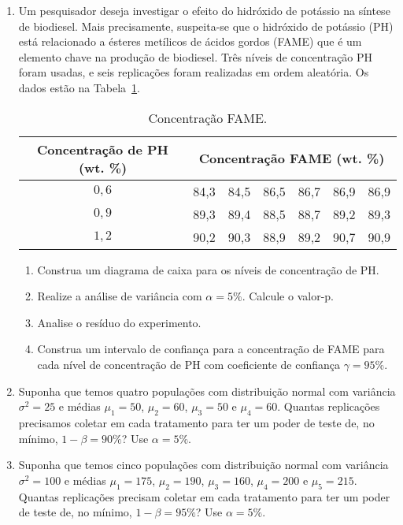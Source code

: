 \documentclass[11pt, a4paper]{article}
\begin{document}
\begin{enumerate}
	\item Um pesquisador deseja investigar o efeito do hidróxido de potássio na síntese de biodiesel. Mais precisamente, suspeita-se que o hidróxido de potássio (PH) está relacionado a ésteres metílicos de ácidos gordos (FAME) que é um elemento chave na produção de biodiesel. Três níveis de concentração PH foram usadas, e seis replicações foram realizadas em ordem aleatória. Os dados estão na Tabela~\ref{tab:fame-ph}.
	\begin{table}[htbp]
		\centering
		\begin{tabular}{c|cccccc}
			\toprule[0.05cm]
			Concentração de PH (wt. \%) & \multicolumn{6}{|c}{Concentração FAME (wt. \%)} \\
			\midrule[0.025cm]
			$0,6$ & 84,3 & 84,5 & 86,5 & 86,7 & 86,9 & 86,9\\
			$0,9$ & 89,3 & 89,4 & 88,5 & 88,7 & 89,2 & 89,3\\
			$1,2$ & 90,2 & 90,3 & 88,9 & 89,2 & 90,7 & 90,9\\ \bottomrule[0.05cm] 
		\end{tabular}
		\caption{Concentração FAME.}
		\label{tab:fame-ph}
	\end{table}
	\begin{enumerate}
		\item Construa um diagrama de caixa para os níveis de concentração de PH.
		\item Realize a análise de variância com $\alpha=5\%$. Calcule o valor-p.
		\item Analise o resíduo do experimento.
		\item Construa um intervalo de confiança para a concentração de  FAME para cada nível de concentração de PH com coeficiente de confiança $\gamma=95\%$.
	\end{enumerate}

	\item Suponha que temos quatro populações com distribuição normal com variância $\sigma^2=25$ e médias $\mu_1=50$, $\mu_2=60$, $\mu_3=50$ e $\mu_4=60$. Quantas replicações precisamos coletar em cada tratamento para ter um poder de teste de, no mínimo, $1-\beta=90\%$? Use $\alpha=5\%$.
	
	\item Suponha que temos cinco populações com distribuição normal com variância $\sigma^2=100$ e médias $\mu_1=175$, $\mu_2=190$, $\mu_3=160$, $\mu_4=200$ e $\mu_5=215$. Quantas replicações precisam coletar em cada tratamento para ter um poder de teste de, no mínimo, $1-\beta=95\%$? Use $\alpha=5\%$.

\end{enumerate}
\end{document}
